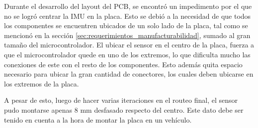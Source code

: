 







Durante el desarrollo del layout del PCB, se encontró un impedimento por el que no se logró centrar la IMU en la placa. Esto se debió a la necesidad de que todos los componentes se encuentren ubicados de un solo lado de la placa, tal como se mencionó en la sección \ref{sec:requerimientos_manufacturabilidad}, sumado al gran tamaño del microcontrolador. El ubicar el sensor en el centro de la placa, fuerza a que el microcontrolador quede en uno de los extremos, lo que dificulta mucho las conexiones de este con el resto de los componentes. Esto además quita espacio necesario para ubicar la gran cantidad de conectores, los cuales deben ubicarse en los extremos de la placa.




A pesar de esto, luego de hacer varias iteraciones en el routeo final, el sensor pudo montarse apenas 8 mm desfasado respecto del centro. Este dato debe ser tenido en cuenta a la hora de montar la placa en un vehículo.




